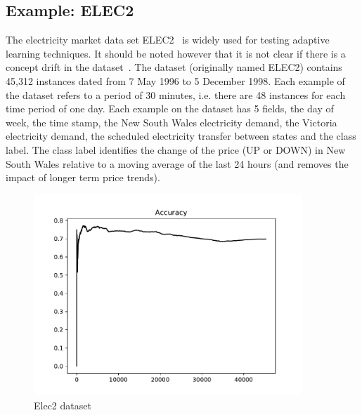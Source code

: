 \subsection{Example: ELEC2}
The electricity market data set ELEC2~\cite{harries1999splice, gama2004learning} is widely used for testing adaptive learning techniques.
It should be noted however that it is not clear if there is a concept drift in the dataset~\cite{zliobaite2013good}. 
%
The dataset (originally named ELEC2) contains 45,312 instances dated from 7 May 1996 to 5 December 1998. 
Each example of the dataset refers to a period of 30 minutes, i.e. there are 48 instances for each time period of one day. 
Each example on the dataset has 5 fields, the day of week, the time stamp, the New South Wales electricity demand, the Victoria electricity demand, the scheduled electricity transfer between states and the class label. 
The class label identifies the change of the price (UP or DOWN) in New South Wales relative to a moving average of the last 24 hours (and removes the impact of longer term price trends). 
%
%
\begin{figure}[!htb]
	\centering
	\includegraphics[width=0.9\textwidth]{images/cd_example_elec2.pdf}
	\caption{Elec2 dataset}\label{fig:elec2}
\end{figure}

